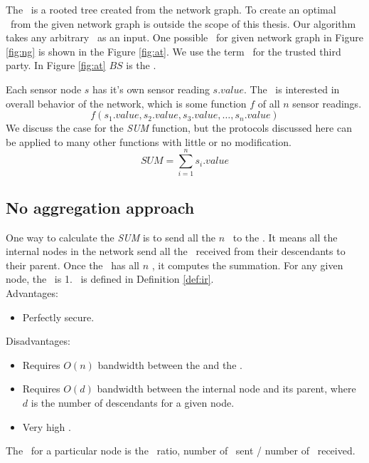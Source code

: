 	The \at\ is a rooted tree created from the network graph. 
	To create an optimal \at\ from the given network graph is outside the scope of this thesis.
	Our algorithm takes any arbitrary \at\ as an input. 
	One possible \at\ for given network graph in Figure \ref{fig:ng} is shown in the Figure \ref{fig:at}.
	We use the term \bs\  for the trusted third party. In Figure \ref{fig:at} $BS$ is the \bs.

	Each sensor node $s$ has it's own sensor reading $s.value$. The \bs\ is interested in overall behavior of the network, which is some function $f$ of all $n$ sensor readings.
	\begin{equation}
		f(s_{1}.value, s_{2}.value, s_{3}.value, \dotsc, s_{n}.value)
	\end{equation}
	We discuss the case for the \textit{SUM} function, but the protocols discussed here can be applied to many other functions with little or no modification. 
	\begin{equation}
		\textit{SUM} = \sum\limits_{i=1}^n s_{i}.value
	\end{equation}

	\subsection{No aggregation approach}
		One way to calculate the \textit{SUM} is to send all the $n$ \payloads\ to the \bs.
		It means all the internal nodes in the network send all the \payloads\ received from their descendants to their parent.
		Once the \bs\ has all $n$ \payloads, it computes the summation.
		For any given node, the \inforate\ is 1. \inforate\ is defined in Definition \ref{def:ir}.\\
		Advantages:
		\begin{itemize}
			\item Perfectly secure.
		\end{itemize}
		Disadvantages:
		\begin{itemize}
			\item Requires $O(n)$ bandwidth between the \bs and the \bs.
			\item Requires $O(d)$ bandwidth between the internal node and its parent, where $d$ is the number of descendants for a given node.
			\item Very high \inforate.
		\end{itemize}
			
	\begin{definition}\label{def:ir}
		The \inforate\ for a particular node is the \payloads\ ratio, number of \payloads\ sent / number of \payloads\ received.
	\end{definition}

